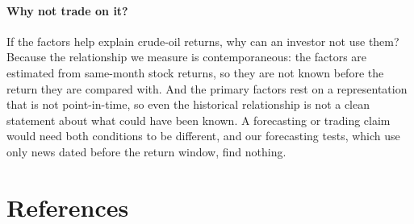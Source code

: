 \documentclass[11pt]{article}
\begin{document}
\paragraph{Why not trade on it?} If the factors help explain crude-oil returns, why can an investor not use them? Because the relationship we measure is contemporaneous: the factors are estimated from same-month stock returns, so they are not known before the return they are compared with. And the primary factors rest on a representation that is not point-in-time, so even the historical relationship is not a clean statement about what could have been known. A forecasting or trading claim would need both conditions to be different, and our forecasting tests, which use only news dated before the return window, find nothing.

\section*{References}
\end{document}
